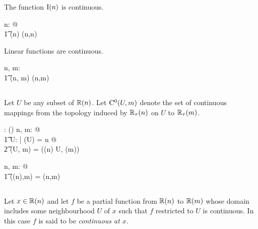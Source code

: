 \documentclass[11pt, oneside]{article}
\begin{document}
\begin{example}
The function $\operatorname{I}(n)$ is continuous.

\begin{zed}
	\forall n: \nat @ \\
	\t1	\In(n) \in \CzeroNN(n,n)
\end{zed}

\begin{theorem}
Linear functions are continuous.

\begin{zed}
	\forall n, m: \nat@ \\
	\t1	\linR(n, m) \subseteq \CzeroNN(n,m)
\end{zed}

\end{theorem}

\end{example}

\subsection{}

Let $U$ be any subset of $\mathbb{R}(n)$.
Let $\operatorname{C^0}(U,m)$ denote the set of continuous mappings from the topology induced by $\mathbb{R}_\tau(n)$ on $U$ to $\mathbb{R}_\tau(m)$.

\begin{axdef}
	\CzeroPRnN: \DeltaR \cross \nat \fun \power (\Rinf \pfun \Rinf)
\where
	\forall n, m: \nat @ \\
	\t1	\forall U: \DeltaR | \dimR(U) = n @ \\
	\t2		\CzeroPRnN(U, m) = \CzeroTT(\RtauN(n) \inducedTopSp U, \RtauN(m))
\end{axdef}

\begin{remark}

\begin{zed}
	\forall n, m: \nat @ \\
	\t1	\CzeroPRnN(\Rtuples(n),m) = \CzeroNN(n,m)
\end{zed}

\end{remark}

\subsection{}

Let $x \in \mathbb{R}(n)$ and let $f$ be a partial function from $\mathbb{R}(n)$ to $\mathbb{R}(m)$
whose domain includes some neighbourhood $U$ of $x$ such that $f$ restricted to $U$ is continuous.
In this case $f$ is said to be {\it continuous at $x$}.
\end{document}

